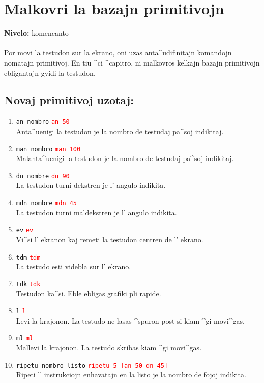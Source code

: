 \chapter{Malkovri la bazajn primitivojn}
\label{bazo}

{ }\hfill\textbf{Nivelo:} komencanto\\ \\
\noindent
Por movi la testudon sur la ekrano, oni uzas anta^udifinitajn
komandojn nomatajn \og primitivoj\fg.  En tiu ^ci ^capitro, ni
malkovros kelkajn bazajn primitivojn ebligantajn gvidi la testudon.
\section{Novaj primitivoj uzotaj:}
\noindent \begin{enumerate}
\item  \texttt{an nombro}\hspace {4cm } \textcolor{red}{ \texttt{an 50}}\\
  Anta^uenigi la testudon je la nombro de testudaj pa^soj indikitaj.
\item  \texttt{man nombro}\hspace {4cm } \textcolor{red}{ \texttt{man 100}}\\
  Malanta^uenigi la testudon je la nombro de testudaj pa^soj indikitaj.
\item  \texttt{dn nombre}\hspace {4cm } \textcolor{red}{\texttt{dn 90}}\\
  La testudon turni dekstren je l' angulo indikita.
\item  \texttt{mdn nombre}\hspace {4cm } \textcolor{red}{ \texttt{mdn 45}}\\
  La testudon turni maldekstren je l' angulo indikita.
\item  \texttt{ev}\hspace {4cm } \textcolor{red}{ \texttt{ev}}\\
  Vi^si l' ekranon kaj remeti la testudon centren de l' ekrano.
\item  \texttt{tdm}\hspace {4cm } \textcolor{red}{ \texttt{tdm}}\\
  La testudo esti videbla sur l' ekrano.
\item  \texttt{tdk}\hspace {4cm } \textcolor{red}{ \texttt{tdk}}\\
  Testudon ka^si.  Eble ebligas grafiki pli rapide.
\item  \texttt{l}\hspace {4cm } \textcolor{red}{ \texttt{l}}\\
  Levi la krajonon.  La testudo ne lasas ^spuron post si kiam ^gi movi^gas.
\item  \texttt{ml}\hspace {4cm } \textcolor{red}{ \texttt{ml}}\\
  Mallevi la krajonon.  La testudo skribas kiam ^gi movi^gas.
\item  \texttt{ripetu nombro listo}\hspace {4cm } \textcolor{red}{ \texttt{ripetu 5 [an 50 dn 45]}}\\
  Ripeti l' instrukciojn enhavatajn en la listo je la nombro de fojoj indikita.
\end{enumerate}

